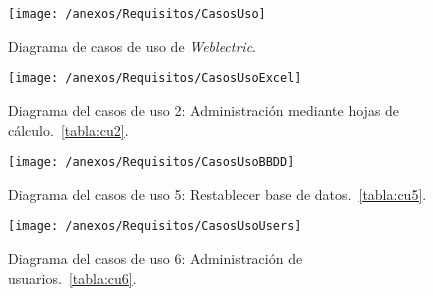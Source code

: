 \begin{figure}[h]
	\centering
	\texttt{[image: /anexos/Requisitos/CasosUso]}
	\caption{Diagrama de casos de uso de \textit{Weblectric}.}
	\label{fig:casosUso}
\end{figure}

\begin{figure}[h]
	\centering
	\texttt{[image: /anexos/Requisitos/CasosUsoExcel]}
	\caption{Diagrama del casos de uso 2: Administración mediante hojas de cálculo.~\ref{tabla:cu2}.}
	\label{fig:casosUsoExcel}
\end{figure}

\begin{figure}[h]
	\centering
	\texttt{[image: /anexos/Requisitos/CasosUsoBBDD]}
	\caption{Diagrama del casos de uso 5: Restablecer base de datos.~\ref{tabla:cu5}.}
	\label{fig:CasosUsoBBDD}
\end{figure}

\begin{figure}[h]
	\centering
	\texttt{[image: /anexos/Requisitos/CasosUsoUsers]}
	\caption{Diagrama del casos de uso 6: Administración de usuarios.~\ref{tabla:cu6}.}
	\label{fig:CasosUsoUsers}
\end{figure}


